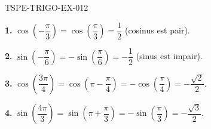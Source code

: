 \begin{corrige}{TSPE-TRIGO-EX-012}


\textbf{1.} $\cos\!\left(-\dfrac{\pi}{3}\right) = \cos\!\left(\dfrac{\pi}{3}\right) = \dfrac{1}{2}$ (cosinus est pair).

\textbf{2.} $\sin\!\left(-\dfrac{\pi}{6}\right) = -\sin\!\left(\dfrac{\pi}{6}\right) = -\dfrac{1}{2}$ (sinus est impair).

\textbf{3.} $\cos\!\left(\dfrac{3\pi}{4}\right) = \cos\!\left(\pi - \dfrac{\pi}{4}\right) = -\cos\!\left(\dfrac{\pi}{4}\right) = -\dfrac{\sqrt{2}}{2}$.

\textbf{4.} $\sin\!\left(\dfrac{4\pi}{3}\right) = \sin\!\left(\pi + \dfrac{\pi}{3}\right) = -\sin\!\left(\dfrac{\pi}{3}\right) = -\dfrac{\sqrt{3}}{2}$.

\end{corrige}

